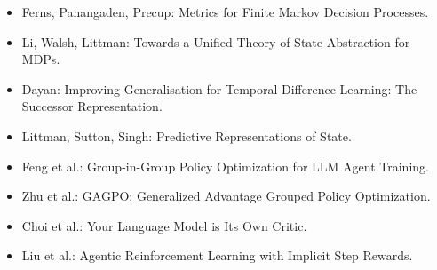\documentclass[
  10pt,
]{ctexart}
\providecommand{\tightlist}{%
  \setlength{\itemsep}{0pt}\setlength{\parskip}{0pt}}
\begin{document}
\begin{itemize}
\tightlist
\item
  Ferns, Panangaden, Precup: Metrics for Finite Markov Decision
  Processes.
\item
  Li, Walsh, Littman: Towards a Unified Theory of State Abstraction for
  MDPs.
\item
  Dayan: Improving Generalisation for Temporal Difference Learning: The
  Successor Representation.
\item
  Littman, Sutton, Singh: Predictive Representations of State.
\item
  Feng et al.: Group-in-Group Policy Optimization for LLM Agent
  Training.
\item
  Zhu et al.: GAGPO: Generalized Advantage Grouped Policy Optimization.
\item
  Choi et al.: Your Language Model is Its Own Critic.
\item
  Liu et al.: Agentic Reinforcement Learning with Implicit Step Rewards.
\end{itemize}
\end{document}
